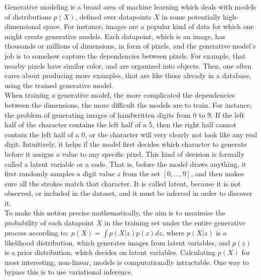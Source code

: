 Generative modeling is a broad area of machine learning which deals with models of distributions $p(X)$, defined over datapoints $X$ in some potentially high-dimensional space. For instance, images are a popular kind of data for which one might create generative models. Each datapoint, which is an image, has thousands or millions of dimensions, in form of pixels, and the generative model’s job is to somehow capture the dependencies between pixels. For example, that nearby pixels have similar color, and are organized into objects. Then, one often cares about producing more examples, that are like those already in a database, using the trained generative model. \\
When training a generative model, the more complicated the dependencies between the dimensions, the more difficult the models are to train. For instance, the problem of generating images of handwritten digits from 0 to 9. If the left half of the character contains the left half of a 5, then the right half cannot contain the left half of a 0, or the character will very clearly not look like any real digit. Intuitively, it helps if the model first decides which character to generate before it assigns a value to any specific pixel. This kind of decision is formally called a latent variable or a code. That is, before the model draws anything, it first randomly samples a digit value $z$ from the set $[0, ..., 9]$, and then makes sure all the strokes match that character. It is called latent, because it is not observed, or included in the dataset, and it must be inferred in order to discover it. \\
To make this notion precise mathematically, the aim is to maximise the probability of each datapoint $X$ in the training set under the entire generative process according to: $p(X) = \int p(X|z)p(z)dz$, where $p(X|z)$ is a likelihood distribution, which generates images from latent variables, and $p(z)$ is a prior distribution, which decides on latent variables. Calculating $p(X)$ for most interesting, non-linear, models is computationally intractable. One way to bypass this is to use variational inference.

